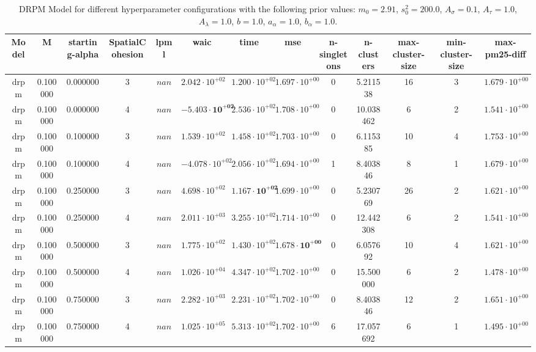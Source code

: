 \begin{table}
\caption{DRPM Model for different hyperparameter configurations with the following prior values: $m_0 = 2.91$, $s_0^2 = 200.0$, $A_\sigma = 0.1$, $A_\tau = 1.0$, $A_\lambda = 1.0$, $b = 1.0$, $a_\alpha = 1.0$, $b_\alpha = 1.0$.}
\centering\begin{tabular}{ccccccccccccc}
\toprule
Model & M & starting-alpha & SpatialCohesion & lpml & waic & time & mse & n-singletons & n-clusters & max-cluster-size & min-cluster-size & max-pm25-diff \\
\midrule
drpm & 0.100000 & 0.000000 & 3 & $nan$ & $2.042 \cdot 10^{+02}$ & $1.200 \cdot 10^{+02}$ & $1.697 \cdot 10^{+00}$ & 0 & 5.211538 & 16 & 3 & $1.679 \cdot 10^{+00}$ \\
drpm & 0.100000 & 0.000000 & 4 & $nan$ & $\mathbf{-5.403 \cdot 10^{+02}}$ & $2.536 \cdot 10^{+02}$ & $1.708 \cdot 10^{+00}$ & 0 & 10.038462 & 6 & 2 & $1.541 \cdot 10^{+00}$ \\
drpm & 0.100000 & 0.100000 & 3 & $nan$ & $1.539 \cdot 10^{+02}$ & $1.458 \cdot 10^{+02}$ & $1.703 \cdot 10^{+00}$ & 0 & 6.115385 & 10 & 4 & $1.753 \cdot 10^{+00}$ \\
drpm & 0.100000 & 0.100000 & 4 & $nan$ & $-4.078 \cdot 10^{+02}$ & $2.056 \cdot 10^{+02}$ & $1.694 \cdot 10^{+00}$ & 1 & 8.403846 & 8 & 1 & $1.679 \cdot 10^{+00}$ \\
drpm & 0.100000 & 0.250000 & 3 & $nan$ & $4.698 \cdot 10^{+02}$ & $\mathbf{1.167 \cdot 10^{+02}}$ & $1.699 \cdot 10^{+00}$ & 0 & 5.230769 & 26 & 2 & $1.621 \cdot 10^{+00}$ \\
drpm & 0.100000 & 0.250000 & 4 & $nan$ & $2.011 \cdot 10^{+03}$ & $3.255 \cdot 10^{+02}$ & $1.714 \cdot 10^{+00}$ & 0 & 12.442308 & 6 & 2 & $1.541 \cdot 10^{+00}$ \\
drpm & 0.100000 & 0.500000 & 3 & $nan$ & $1.775 \cdot 10^{+02}$ & $1.430 \cdot 10^{+02}$ & $\mathbf{1.678 \cdot 10^{+00}}$ & 0 & 6.057692 & 10 & 4 & $1.621 \cdot 10^{+00}$ \\
drpm & 0.100000 & 0.500000 & 4 & $nan$ & $1.026 \cdot 10^{+04}$ & $4.347 \cdot 10^{+02}$ & $1.702 \cdot 10^{+00}$ & 0 & 15.500000 & 6 & 2 & $1.478 \cdot 10^{+00}$ \\
drpm & 0.100000 & 0.750000 & 3 & $nan$ & $2.282 \cdot 10^{+03}$ & $2.231 \cdot 10^{+02}$ & $1.702 \cdot 10^{+00}$ & 0 & 8.403846 & 12 & 2 & $1.651 \cdot 10^{+00}$ \\
drpm & 0.100000 & 0.750000 & 4 & $nan$ & $1.025 \cdot 10^{+05}$ & $5.313 \cdot 10^{+02}$ & $1.702 \cdot 10^{+00}$ & 6 & 17.057692 & 6 & 1 & $1.495 \cdot 10^{+00}$ \\

\end{tabular}
\end{table}
